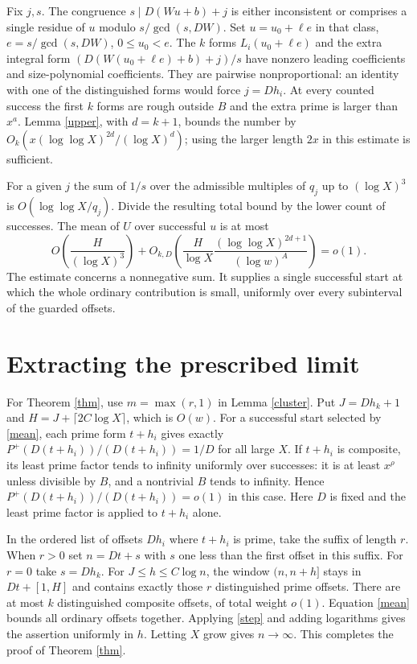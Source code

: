 \documentclass[10pt]{article}
\begin{document}
Fix $j,s$. The congruence $s\mid D(Wu+b)+j$ is either inconsistent or comprises a single residue of $u$ modulo $s/\gcd(s,DW)$. Set $u=u_0+\ell e$ in that class, $e=s/\gcd(s,DW)$, $0\le u_0<e$. The $k$ forms $L_i(u_0+\ell e)$ and the extra integral form $(D(W(u_0+\ell e)+b)+j)/s$ have nonzero leading coefficients and size-polynomial coefficients. They are pairwise nonproportional: an identity with one of the distinguished forms would force $j=Dh_i$. At every counted success the first $k$ forms are rough outside $B$ and the extra prime is larger than $x^a$. Lemma \ref{upper}, with $d=k+1$, bounds the number by $O_k(x(\log\log X)^{2d}/(\log X)^d)$; using the larger length $2x$ in this estimate is sufficient.

For a given $j$ the sum of $1/s$ over the admissible multiples of $q_j$ up to $(\log X)^3$ is $O(\log\log X/q_j)$. Divide the resulting total bound by the lower count of successes. The mean of $U$ over successful $u$ is at most
\begin{equation}\label{mean}
 O\left(\frac{H}{(\log X)^3}\right)
 +O_{k,D}\left(\frac{H}{\log X}
          \frac{(\log\log X)^{2d+1}}{(\log w)^A}\right)=o(1).
\end{equation}
The estimate concerns a nonnegative sum. It supplies a single successful start at which the whole ordinary contribution is small, uniformly over every subinterval of the guarded offsets.

\section{Extracting the prescribed limit}
For Theorem \ref{thm}, use $m=\max(r,1)$ in Lemma \ref{cluster}. Put $J=Dh_k+1$ and $H=J+\lceil 2C\log X\rceil$, which is $O(w)$. For a successful start selected by \eqref{mean}, each prime form $t+h_i$ gives exactly $P^+(D(t+h_i))/(D(t+h_i))=1/D$ for all large $X$. If $t+h_i$ is composite, its least prime factor tends to infinity uniformly over successes: it is at least $x^\rho$ unless divisible by $B$, and a nontrivial $B$ tends to infinity. Hence $P^+(D(t+h_i))/(D(t+h_i))=o(1)$ in this case. Here $D$ is fixed and the least prime factor is applied to $t+h_i$ alone.

In the ordered list of offsets $Dh_i$ where $t+h_i$ is prime, take the suffix of length $r$. When $r>0$ set $n=Dt+s$ with $s$ one less than the first offset in this suffix. For $r=0$ take $s=Dh_k$. For $J\le h\le C\log n$, the window $(n,n+h]$ stays in $Dt+[1,H]$ and contains exactly those $r$ distinguished prime offsets. There are at most $k$ distinguished composite offsets, of total weight $o(1)$. Equation \eqref{mean} bounds all ordinary offsets together. Applying \eqref{step} and adding logarithms gives the assertion uniformly in $h$. Letting $X$ grow gives $n\to\infty$. This completes the proof of Theorem \ref{thm}.
\end{document}
